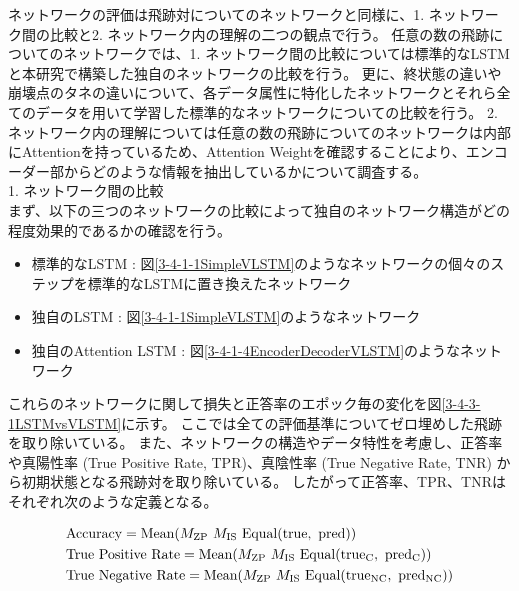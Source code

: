 ネットワークの評価は飛跡対についてのネットワークと同様に、1. ネットワーク間の比較と2. ネットワーク内の理解の二つの観点で行う。
任意の数の飛跡についてのネットワークでは、1. ネットワーク間の比較については標準的なLSTMと本研究で構築した独自のネットワークの比較を行う。
更に、終状態の違いや崩壊点のタネの違いについて、各データ属性に特化したネットワークとそれら全てのデータを用いて学習した標準的なネットワークについての比較を行う。
2. ネットワーク内の理解については任意の数の飛跡についてのネットワークは内部にAttentionを持っているため、Attention Weightを確認することにより、エンコーダー部からどのような情報を抽出しているかについて調査する。\\

1. ネットワーク間の比較\\

まず、以下の三つのネットワークの比較によって独自のネットワーク構造がどの程度効果的であるかの確認を行う。

\begin{itemize}
 \item 標準的なLSTM : 図\ref{3-4-1-1SimpleVLSTM}のようなネットワークの個々のステップを標準的なLSTMに置き換えたネットワーク
 \item 独自のLSTM : 図\ref{3-4-1-1SimpleVLSTM}のようなネットワーク
 \item 独自のAttention LSTM : 図\ref{3-4-1-4EncoderDecoderVLSTM}のようなネットワーク
\end{itemize}

これらのネットワークに関して損失と正答率のエポック毎の変化を図\ref{3-4-3-1LSTMvsVLSTM}に示す。
ここでは全ての評価基準についてゼロ埋めした飛跡を取り除いている。
また、ネットワークの構造やデータ特性を考慮し、正答率や真陽性率 (True Positive Rate, TPR)、真陰性率 (True Negative Rate, TNR) から初期状態となる飛跡対を取り除いている。
したがって正答率、TPR、TNRはそれぞれ次のような定義となる。

\begin{equation}
 \begin{split}
  &{\rm Accuracy} 
  = {\rm Mean (} M_{\rm ZP}\  M_{\rm IS}\  {\rm Equal (true,\ pred) )}\\
 &{\rm True\  Positive\  Rate} 
  = {\rm Mean (} M_{\rm ZP}\  M_{\rm IS}\  {\rm Equal (true_C,\ pred_C) )}\\
 &{\rm True\  Negative\  Rate}
  = {\rm Mean (} M_{\rm ZP}\  M_{\rm IS}\  {\rm Equal (true_{NC},\ pred_{NC}) )}\\
 \end{split}
\end{equation}

